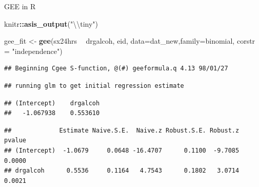 \documentclass[ignorenonframetext,]{beamer}
\newenvironment{Shaded}{\begin{snugshade}}{\end{snugshade}}
\newcommand{\KeywordTok}[1]{\textcolor[rgb]{0.13,0.29,0.53}{\textbf{#1}}}
\newcommand{\DataTypeTok}[1]{\textcolor[rgb]{0.13,0.29,0.53}{#1}}
\newcommand{\DecValTok}[1]{\textcolor[rgb]{0.00,0.00,0.81}{#1}}
\newcommand{\CharTok}[1]{\textcolor[rgb]{0.31,0.60,0.02}{#1}}
\newcommand{\StringTok}[1]{\textcolor[rgb]{0.31,0.60,0.02}{#1}}
\newcommand{\CommentTok}[1]{\textcolor[rgb]{0.56,0.35,0.01}{\textit{#1}}}
\newcommand{\OperatorTok}[1]{\textcolor[rgb]{0.81,0.36,0.00}{\textbf{#1}}}
\newcommand{\NormalTok}[1]{#1}
\begin{document}
\begin{frame}[fragile]{GEE in R}

\begin{Shaded}
\begin{Highlighting}[]
\NormalTok{knitr}\OperatorTok{::}\KeywordTok{asis_output}\NormalTok{(}\StringTok{"}\CharTok{\textbackslash{}\textbackslash{}}\StringTok{tiny"}\NormalTok{)}
\end{Highlighting}
\end{Shaded}

\tiny

\begin{Shaded}
\begin{Highlighting}[]
\NormalTok{gee_fit <-}\StringTok{ }\KeywordTok{gee}\NormalTok{(sx24hrs }\OperatorTok{~}\StringTok{ }\NormalTok{drgalcoh, eid, }\DataTypeTok{data=}\NormalTok{dat_new,}\DataTypeTok{family=}\NormalTok{binomial, }\DataTypeTok{corstr =} \StringTok{"independence"}\NormalTok{)}
\end{Highlighting}
\end{Shaded}

\begin{verbatim}
## Beginning Cgee S-function, @(#) geeformula.q 4.13 98/01/27
\end{verbatim}

\begin{verbatim}
## running glm to get initial regression estimate
\end{verbatim}

\begin{verbatim}
## (Intercept)    drgalcoh 
##   -1.067938    0.553610
\end{verbatim}

\begin{Shaded}
\end{Shaded}

\begin{verbatim}
##             Estimate Naive.S.E.  Naive.z Robust.S.E. Robust.z pvalue
## (Intercept)  -1.0679     0.0648 -16.4707      0.1100  -9.7085 0.0000
## drgalcoh      0.5536     0.1164   4.7543      0.1802   3.0714 0.0021
\end{verbatim}


\end{frame}
\end{document}
